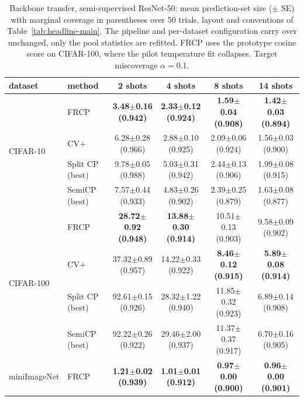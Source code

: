 \begin{table}[t]
\centering
\small
\caption{Backbone transfer, semi-supervised ResNet-50: mean prediction-set size ($\pm$ SE) with marginal coverage in parentheses over 50 trials, layout and conventions of Table~\ref{tab:headline-main}. The pipeline and per-dataset configuration carry over unchanged, only the pool statistics are refitted. FRCP uses the prototype cosine score on CIFAR-100, where the pilot temperature fit collapses. Target miscoverage $\alpha=0.1$.}
\label{tab:backbone-resnet50}
\begin{tabular}{llcccc}
\toprule
dataset & method & 2 shots & 4 shots & 8 shots & 14 shots\\
\midrule
\multirow{4}{*}{CIFAR-10} & FRCP & \textbf{3.48$\pm$0.16 {\scriptsize(0.942)}} & \textbf{2.33$\pm$0.12 {\scriptsize(0.924)}} & \textbf{1.59$\pm$0.04 {\scriptsize(0.908)}} & \textbf{1.42$\pm$0.03 {\scriptsize(0.894)}}\\
 & CV+ & 6.28$\pm$0.28 {\scriptsize(0.966)} & 2.88$\pm$0.10 {\scriptsize(0.925)} & 2.09$\pm$0.06 {\scriptsize(0.924)} & 1.56$\pm$0.03 {\scriptsize(0.900)}\\
 & Split CP (best) & 9.78$\pm$0.05 {\scriptsize(0.988)} & 5.03$\pm$0.31 {\scriptsize(0.942)} & 2.44$\pm$0.13 {\scriptsize(0.906)} & 1.99$\pm$0.08 {\scriptsize(0.915)}\\
 & SemiCP (best) & 7.57$\pm$0.44 {\scriptsize(0.933)} & 4.83$\pm$0.26 {\scriptsize(0.902)} & 2.39$\pm$0.25 {\scriptsize(0.879)} & 1.63$\pm$0.08 {\scriptsize(0.877)}\\
\midrule
\multirow{4}{*}{CIFAR-100} & FRCP & \textbf{28.72$\pm$0.92 {\scriptsize(0.948)}} & \textbf{13.88$\pm$0.30 {\scriptsize(0.914)}} & 10.51$\pm$0.13 {\scriptsize(0.903)} & 9.58$\pm$0.09 {\scriptsize(0.902)}\\
 & CV+ & 37.32$\pm$0.89 {\scriptsize(0.957)} & 14.22$\pm$0.33 {\scriptsize(0.922)} & \textbf{8.46$\pm$0.12 {\scriptsize(0.915)}} & \textbf{5.89$\pm$0.08 {\scriptsize(0.914)}}\\
 & Split CP (best) & 92.61$\pm$0.15 {\scriptsize(0.926)} & 28.32$\pm$1.22 {\scriptsize(0.940)} & 11.85$\pm$0.32 {\scriptsize(0.923)} & 6.89$\pm$0.14 {\scriptsize(0.908)}\\
 & SemiCP (best) & 92.22$\pm$0.26 {\scriptsize(0.922)} & 29.46$\pm$2.00 {\scriptsize(0.937)} & 11.37$\pm$0.37 {\scriptsize(0.917)} & 6.70$\pm$0.16 {\scriptsize(0.905)}\\
\midrule
\multirow{4}{*}{miniImageNet} & FRCP & \textbf{1.21$\pm$0.02 {\scriptsize(0.939)}} & \textbf{1.01$\pm$0.01 {\scriptsize(0.912)}} & \textbf{0.97$\pm$0.00 {\scriptsize(0.900)}} & \textbf{0.96$\pm$0.00 {\scriptsize(0.901)}}\\

\end{tabular}
\end{table}
